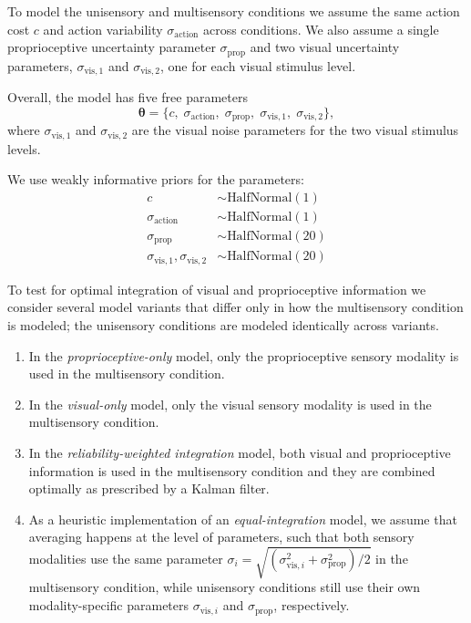 \documentclass{article}
\begin{document}
To model the unisensory and multisensory conditions we assume the same action cost $c$ and action variability $\sigma_\text{action}$ across conditions. We also assume a single proprioceptive uncertainty parameter $\sigma_\text{prop}$ and two visual uncertainty parameters, $\sigma_{\text{vis},1}$ and $\sigma_{\text{vis},2}$, one for each visual stimulus level.

Overall, the model has five free parameters
\[\bm\theta=\{c,\;\sigma_\text{action},\;\sigma_\text{prop},\;\sigma_{\text{vis},1},\;\sigma_{\text{vis},2}\},\]
where $\sigma_{\text{vis},1}$ and $\sigma_{\text{vis},2}$ are the visual noise parameters for the two visual stimulus levels.

We use weakly informative priors for the parameters:
\begin{align*}
    c &\sim \text{HalfNormal}(1) \\
    \sigma_\text{action} &\sim \text{HalfNormal}(1) \\
    \sigma_\text{prop} &\sim \text{HalfNormal}(20) \\ 
    \sigma_{\text{vis},1}, \sigma_{\text{vis},2} &\sim \text{HalfNormal}(20) 
\end{align*}

To test for optimal integration of visual and proprioceptive information we consider several model variants that differ only in how the multisensory condition is modeled; the unisensory conditions are modeled identically across variants.
\begin{enumerate}
    \item In the \textit{proprioceptive-only} model, only the proprioceptive sensory modality is used in the multisensory condition.
    \item In the \textit{visual-only} model, only the visual sensory modality is used in the multisensory condition.
    \item In the \textit{reliability-weighted integration} model, both visual and proprioceptive information is used in the multisensory condition and they are combined optimally as prescribed by a Kalman filter. 
    \item As a heuristic implementation of an \textit{equal-integration} model, we assume that averaging happens at the level of parameters, such that both sensory modalities use the same parameter $\sigma_i = \sqrt{( \sigma_{\text{vis},i}^2 + \sigma_\text{prop}^2) / 2}$ in the multisensory condition, while unisensory conditions still use their own modality-specific parameters $\sigma_{\text{vis},i}$ and $\sigma_\text{prop}$, respectively.    
\end{enumerate}
 
\end{document}
